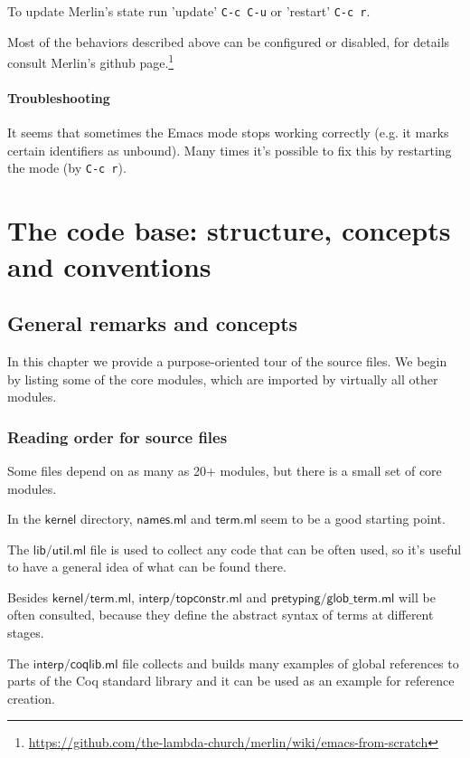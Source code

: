 \documentclass[a4paper,oneside]{book}
\newcommand{\m}[1]{\ensuremath{\mathsf{#1}}}
\begin{document}
To update Merlin's state run 'update' \verb|C-c C-u| or 'restart'
\verb|C-c r|.

Most of the behaviors described above can be configured or disabled,
for details consult Merlin's github
page.\footnote{\url{https://github.com/the-lambda-church/merlin/wiki/emacs-from-scratch}}

\subsection{Troubleshooting}

It seems that sometimes the Emacs mode stops working correctly
(e.g. it marks certain identifiers as unbound). Many times it's
possible to fix this by restarting the mode (by \verb|C-c r|).

\part{The code base: structure, concepts and conventions}

\chapter{General remarks and concepts}

In this chapter we provide a purpose-oriented tour of the source
files. We begin by listing some of the core modules, which are
imported by virtually all other modules.

\section{Reading order for source files}

Some files depend on as many as 20+ modules, but there is a small set
of core modules.

In the \m{kernel} directory, \m{names.ml} and \m{term.ml} seem to be a
good starting point.

The \m{lib/util.ml} file is used to collect any code that can be often
used, so it's useful to have a general idea of what can be found there.

Besides \m{kernel/term.ml}, \m{interp/topconstr.ml} and
\m{pretyping/glob\_term.ml} will be often consulted, because they
define the abstract syntax of terms at different stages.

The \m{interp/coqlib.ml} file collects and builds many examples of
global references to parts of the Coq standard library and it can be
used as an example for reference creation.
\end{document}
